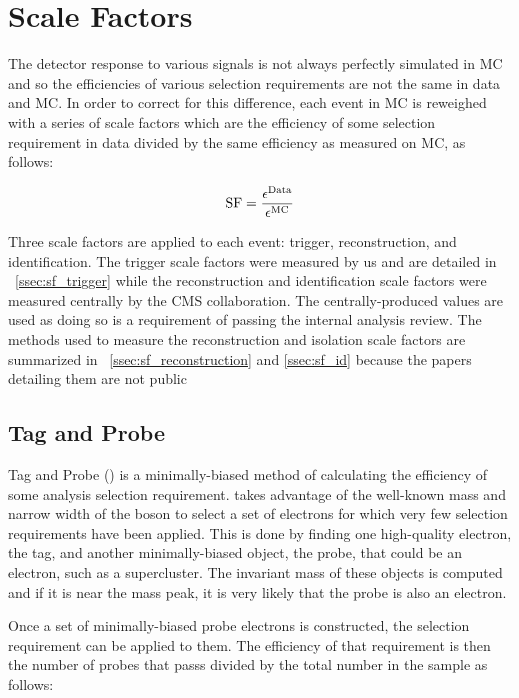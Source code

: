 \section{Scale Factors}
\label{sec:scale_factors}

The detector response to various signals is not always perfectly simulated in
MC and so the efficiencies of various selection requirements are not the same
in data and MC. In order to correct for this difference, each event in MC is
reweighed with a series of scale factors which are the efficiency of some
selection requirement in data divided by the same efficiency as measured on MC,
as follows:

\begin{equation}
    \label{eq:sf}
    \text{SF} = \frac{\epsilon^{\text{Data}}}{\epsilon^{\text{MC}}}
\end{equation}

Three scale factors are applied to each event: trigger, reconstruction, and
identification. The trigger scale factors were measured by us and are detailed
in \SEC~\ref{ssec:sf_trigger} while the reconstruction and identification scale
factors were measured centrally by the CMS collaboration. The
centrally-produced values are used as doing so is a requirement of passing the
internal analysis review. The methods used to measure the reconstruction and
isolation scale factors are summarized in \SECS~\ref{ssec:sf_reconstruction}
and \ref{ssec:sf_id} because the papers detailing them are not public

\subsection{Tag and Probe}

Tag and Probe (\TnP) is a minimally-biased method of calculating the efficiency
of some analysis selection requirement. \TnP takes advantage of the well-known
mass and narrow width of the \Z boson to select a set of electrons for which
very few selection requirements have been applied. This is done by finding one
high-quality electron, the tag, and another minimally-biased object, the probe,
that could be an electron, such as a supercluster. The invariant mass of these
objects is computed and if it is near the \Z mass peak, it is very likely that
the probe is also an electron.

Once a set of minimally-biased probe electrons is constructed, the selection
requirement can be applied to them. The efficiency of that requirement is then
the number of probes that passs divided by the total number in the sample as
follows:

